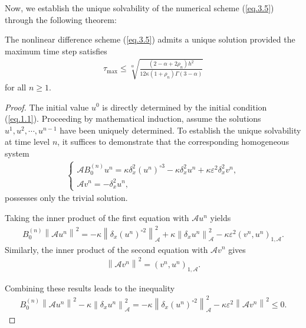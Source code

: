 \documentclass{siamart171218}
\theoremstyle{remark}
\theoremstyle{example}
\numberwithin{equation}{section}
\begin{document}
Now, we establish the unique solvability of the numerical scheme (\ref{eq.3.5}) through the following theorem:

\begin{theorem}\label{Th.4.2}
The nonlinear difference scheme (\ref{eq.3.5}) admits a unique solution provided the maximum time step satisfies
\begin{align*}
\tau_{\max} \leq \sqrt[\alpha]{\frac{(2-\alpha+2\rho_n)h^2}{12\kappa(1+\rho_n)\Gamma(3-\alpha)}}
\end{align*}
for all $n \geq 1$.
\end{theorem}

\begin{proof}
The initial value $u^{0}$ is directly determined by the initial condition (\ref{eq.1.1}). Proceeding by mathematical induction, assume the solutions ${u^{1}, u^{2}, \cdots, u^{n-1}}$ have been uniquely determined. To establish the unique solvability at time level $n$, it suffices to demonstrate that the corresponding homogeneous system
\begin{align*}
\begin{cases}
\mathscr{A} B_{0}^{(n)} u^n = \kappa \delta_x^2 \left(u^{n}\right)^{\circ 3} - \kappa \delta_x^2 u^{n} + \kappa \varepsilon^2 \delta_x^2 v^n, \\
\mathscr{A} v^n = -\delta_x^2 u^n,
\end{cases}
\end{align*}
possesses only the trivial solution.

Taking the inner product of the first equation with
$\mathscr{A} u^n$ yields
\begin{align*}
    B_{0}^{(n)} \left\|\mathscr{A} u^n\right\|^2 =
    -\kappa \left\|\delta_x(u^{n})^{\circ 2}\right\|_\mathcal{A}^2
     + \kappa \left\|\delta_x u^{n}\right\|_\mathcal{A}^2
      - \kappa \varepsilon^2 \left(v^n,u^n\right)_{1,\mathcal{A}}.
\end{align*}
Similarly, the inner product of the second equation
 with $\mathscr{A} v^n$ gives
\begin{align*}
    \left\|\mathscr{A} v^n\right\|^2 =
     \left(v^n,u^n\right)_{1,\mathcal{A}}.
\end{align*}

Combining these results leads to the inequality
\begin{align*}
    B_{0}^{(n)} \left\|\mathscr{A} u^n\right\|^2
     - \kappa \left\|\delta_x u^{n}\right\|_\mathcal{A}^2 = -\kappa \left\|\delta_x\left(u^{n}\right)^{\circ 2}\right\|_\mathcal{A}^2
     - \kappa \varepsilon^2 \left\|\mathscr{A} v^n\right\|^2 \leq 0.
\end{align*}


\end{proof}
\end{document}
